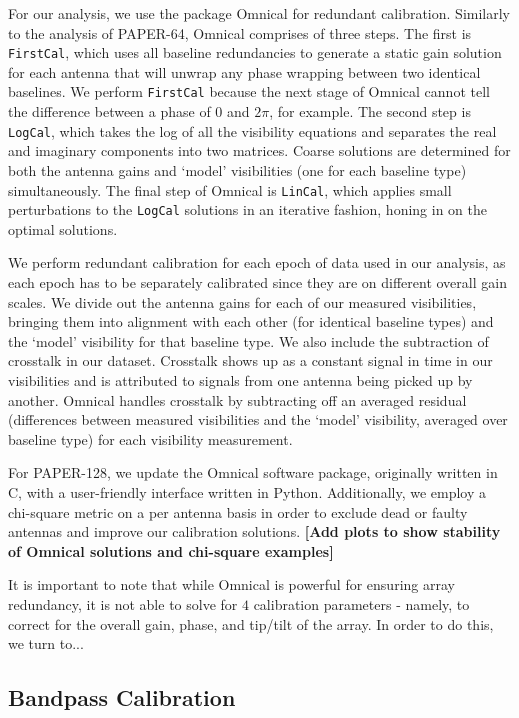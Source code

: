 \documentclass[preprint2,numberedappendix,tighten,twocolappendix]{aastex6}  %
\newcommand{\cc}[1]{{\color{purple} \textbf{[#1]}}}
\begin{document}
For our analysis, we use the package {\sc Omnical} for redundant calibration. Similarly to the analysis of PAPER-64, {\sc Omnical} comprises of three steps. The first is {\tt FirstCal}, which uses all baseline redundancies to generate a static gain solution for each antenna that will unwrap any phase wrapping between two identical baselines. We perform {\tt FirstCal} because the next stage of {\sc Omnical} cannot tell the difference between a phase of $0$ and $2\pi$, for example. The second step is {\tt LogCal}, which takes the log of all the visibility equations and separates the real and imaginary components into two matrices. Coarse solutions are determined for both the antenna gains and `model' visibilities (one for each baseline type) simultaneously. The final step of {\sc Omnical} is {\tt LinCal}, which applies small perturbations to the {\tt LogCal} solutions in an iterative fashion, honing in on the optimal solutions.

We perform redundant calibration for each epoch of data used in our analysis, as each epoch has to be separately calibrated since they are on different overall gain scales. We divide out the antenna gains for each of our measured visibilities, bringing them into alignment with each other (for identical baseline types) and the `model' visibility for that baseline type. We also include the subtraction of crosstalk in our dataset. Crosstalk shows up as a constant signal in time in our visibilities and is attributed to signals from one antenna being picked up by another. {\sc Omnical} handles crosstalk by subtracting off an averaged residual (differences between measured visibilities and the `model' visibility, averaged over baseline type) for each visibility measurement.

For PAPER-128, we update the {\sc Omnical} software package, originally written in C, with a user-friendly interface written in Python.  Additionally, we employ a chi-square metric on a per antenna basis in order to exclude dead or faulty antennas and improve our calibration solutions. \cc{Add plots to show stability of {\sc Omnical} solutions and chi-square examples}
 
It is important to note that while {\sc Omnical} is powerful for ensuring array redundancy, it is not able to solve for $4$ calibration parameters - namely, to correct for the overall gain, phase, and tip/tilt of the array. In order to do this, we turn to...

\subsection{Bandpass Calibration}
\end{document}
